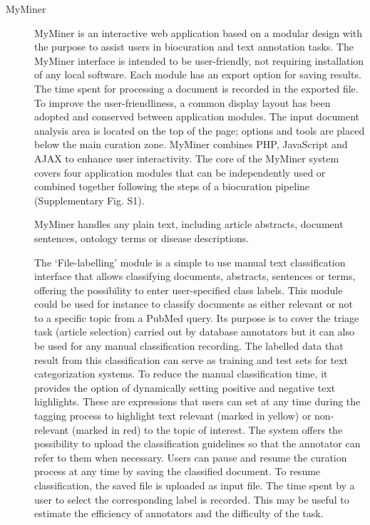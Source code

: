 \begin{description}
    \item[MyMiner]
    MyMiner is an interactive web application based on a modular design with the purpose to assist users in biocuration and text annotation tasks. The MyMiner interface is intended to be user-friendly, not requiring installation of any local software. Each module has an export option for saving results. The time spent for processing a document is recorded in the exported file. To improve the user-friendliness, a common display layout has been adopted and conserved between application modules. The input document analysis area is located on the top of the page; options and tools are placed below the main curation zone. MyMiner combines PHP, JavaScript and AJAX to enhance user interactivity. The core of the MyMiner system covers four application modules that can be independently used or combined together following the steps of a biocuration pipeline (Supplementary Fig. S1).

    MyMiner handles any plain text, including article abstracts, document sentences, ontology terms or disease descriptions.

    The ‘File-labelling’ module is a simple to use manual text classification interface that allows classifying documents, abstracts, sentences or terms, offering the possibility to enter user-specified class labels. This module could be used for instance to classify documents as either relevant or not to a specific topic from a PubMed query. Its purpose is to cover the triage task (article selection) carried out by database annotators but it can also be used for any manual classification recording. The labelled data that result from this classification can serve as training and test sets for text categorization systems. To reduce the manual classification time, it provides the option of dynamically setting positive and negative text highlights. These are expressions that users can set at any time during the tagging process to highlight text relevant (marked in yellow) or non-relevant (marked in red) to the topic of interest. The system offers the possibility to upload the classification guidelines so that the annotator can refer to them when necessary. Users can pause and resume the curation process at any time by saving the classified document. To resume classification, the saved file is uploaded as input file. The time spent by a user to select the corresponding label is recorded. This may be useful to estimate the efficiency of annotators and the difficulty of the task.


\end{description}
